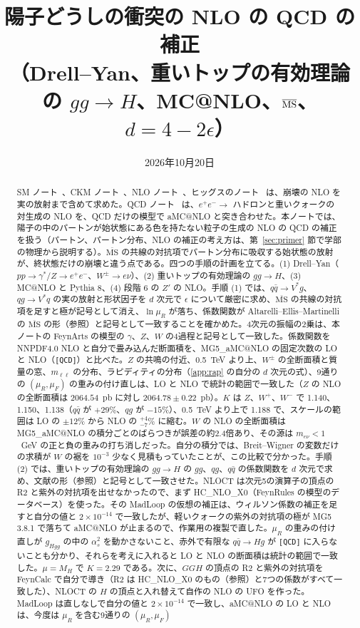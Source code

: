 \documentclass[a4paper,10pt]{ltjsarticle}
\title{陽子どうしの衝突の NLO の QCD の補正\\（Drell--Yan、重いトップの有効理論の $gg\to H$、MC@NLO、$\MSbar$、$d=4-2\epsilon$）}
\author{}
\date{2026年10月20日}
\makeatletter
\newcommand{\MSbar}{\overline{\mathrm{MS}}}
\newcommand{\MGaMC}{MG5\_aMC@NLO}
\makeatother
\begin{document}
\maketitle

\begin{abstract}
SM ノート~\cite{smnote}、CKM ノート~\cite{ckmnote}、NLO ノート~\cite{nlonote}、ヒッグスのノート~\cite{higgsnote} は、崩壊の NLO を実の放射まで含めて求めた。QCD ノート~\cite{qcdnote} は、$e^+e^-\to$ ハドロンと重いクォークの対生成の NLO を、QCD だけの模型で aMC@NLO と突き合わせた。本ノートでは、陽子の中のパートンが始状態にある色を持たない粒子の生成の NLO の QCD の補正を扱う（パートン、パートン分布、NLO の補正の考え方は、第~\ref{sec:primer} 節で学部の物理から説明する）。$\overline{\mathrm{MS}}$ の共線の対抗項でパートン分布に吸収する始状態の放射が、終状態だけの崩壊と違う点である。四つの手順の計画を立てる。(1) Drell--Yan（$pp\to\gamma^*/Z\to e^+e^-$、$W^\pm\to e\nu$）、(2) 重いトップの有効理論の $gg\to H$、(3) MC@NLO と Pythia 8、(4) 段階 6 の $Z'$ の NLO。手順 (1) では、$q\bar q\to V^*g$、$qg\to V^*q$ の実の放射と形状因子を $d$ 次元で $\epsilon$ について厳密に求め、$\MSbar$ の共線の対抗項を足すと極が記号として消え、$\ln\mu_R$ が落ち、係数関数が Altarelli--Ellis--Martinelli の $\MSbar$ の形（参照）と記号として一致することを確かめた。4次元の振幅の2乗は、本ノートの FeynArts の模型の $\gamma$、$Z$、$W$ の4過程と記号として一致した。係数関数を NNPDF4.0 NLO と自分で畳み込んだ断面積を、\MGaMC{} の固定次数の LO と NLO（\texttt{[QCD]}）と比べた。$Z$ の共鳴の付近、0.5~TeV より上、$W^\pm$ の全断面積と質量の窓、$m_{\ell\ell}$ の分布、ラピディティの分布（\ref{app:rap} の自分の $d$ 次元の式）、9通りの $(\mu_R,\mu_F)$ の重みの付け直しは、LO と NLO で統計の範囲で一致した（$Z$ の NLO の全断面積は $2064.54$~pb に対し $2064.78\pm0.22$~pb）。$K$ は $Z$、$W^+$、$W^-$ で 1.140、1.150、1.138（$q\bar q$ が $+29\%$、$qg$ が $-15\%$）、0.5~TeV より上で 1.188 で、スケールの範囲は LO の $\pm12\%$ から NLO の $^{+4}_{-7}\%$ に縮む。$W$ の NLO の全断面積は \MGaMC{} の積分ごとのばらつきが誤差の約2.4倍あり、その源は $m_{e\nu}<1$~GeV の正と負の重みの打ち消しだった。自分の積分では、Breit--Wigner の変数だけの求積が $W$ の裾を $10^{-3}$ 少なく見積もっていたことが、この比較で分かった。手順 (2) では、重いトップの有効理論の $gg\to H$ の $gg$、$qg$、$q\bar q$ の係数関数を $d$ 次元で求め、文献の形（参照）と記号として一致させた。NLOCT は次元5の演算子の頂点の R2 と紫外の対抗項を出せなかったので、まず HC\_NLO\_X0（FeynRules の模型のデータベース）を使った。その MadLoop の仮想の補正は、ウィルソン係数の補正を足すと自分の値と $2\times10^{-14}$ で一致したが、軽いクォークの紫外の対抗項の極が MG5 3.8.1 で落ちて aMC@NLO が止まるので、作業用の複製で直した。$\mu_R$ の重みの付け直しが $g_{Hgg}$ の中の $\alpha_s^2$ を動かさないこと、赤外で有限な $q\bar q\to Hg$ が \texttt{[QCD]} に入らないことも分かり、それらを考えに入れると LO と NLO の断面積は統計の範囲で一致した。$\mu=M_H$ で $K=2.29$ である。次に、$GGH$ の頂点の R2 と紫外の対抗項を FeynCalc で自分で導き（R2 は HC\_NLO\_X0 のもの（参照）と7つの係数がすべて一致した）、NLOCT の $H$ の頂点と入れ替えて自作の NLO の UFO を作った。MadLoop は直しなしで自分の値と $2\times10^{-14}$ で一致し、aMC@NLO の LO と NLO は、今度は $\mu_R$ を含む9通りの $(\mu_R,\mu_F)$ 
\end{abstract}
\end{document}
